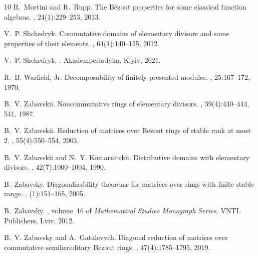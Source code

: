 \documentclass{cimart}
\begin{document}
{\begin{thebibliography}{10}
R.~Mortini and R.~Rupp.
\newblock The {B}\'{e}zout properties for some classical function algebras.
, 24(1):229--253, 2013.

V.~P. Shchedryk.
\newblock Commutative domains of elementary divisors and some properties of
  their elements.
, 64(1):140--155, 2012.

V.~P. Shchedryk.
.
\newblock Akademperiodyka, Kiyiv, 2021.

R.~B. Warfield, Jr.
\newblock Decomposability of finitely presented modules.
, 25:167--172, 1970.

B.~V. Zabavskii.
\newblock Noncommutative rings of elementary divisors.
, 39(4):440--444, 541, 1987.

B.~V. Zabavskii.
\newblock Reduction of matrices over {B}ezout rings of stable rank at most 2.
, 55(4):550--554, 2003.

B.~V. Zabavskii and N.~Y. Komarnitskii.
\newblock Distributive domains with elementary divisors.
, 42(7):1000--1004, 1990.

B.~Zabavsky.
\newblock Diagonalizability theorems for matrices over rings with finite stable
  range.
, (1):151--165, 2005.

B.~Zabavsky.
, volume~16 of {\em
  Mathematical Studies Monograph Series}.
\newblock VNTL Publishers, Lviv, 2012.

B.~V. Zabavsky and A.~Gatalevych.
\newblock Diagonal reduction of matrices over commutative semihereditary
  {B}ezout rings.
, 47(4):1785--1795, 2019.

\end{thebibliography}


}
\end{document}
